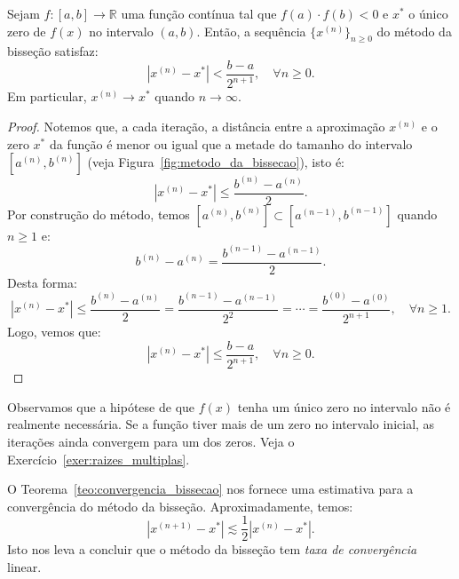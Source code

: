 \begin{ex}
\begin{teo}\label{teo:convergencia_bissecao} Sejam $f:[a, b]\to \mathbb{R}$ uma função contínua tal que $f(a)\cdot f(b) < 0$ e $x^*$ o único zero de $f(x)$ no intervalo $(a, b)$. Então, a sequência $\{x^{(n)}\}_{n \geq 0}$ do método da bisseção satisfaz:
  \begin{equation}
    |x^{(n)} - x^{*}| < \frac{b - a}{2^{n+1}},\quad\forall n\geq 0.
  \end{equation}
Em particular, $x^{(n)}\to x^*$ quando $n\to\infty$.
\end{teo}
\begin{proof}
 Notemos que, a cada iteração, a distância entre a aproximação $x^{(n)}$ e o zero $x^*$ da função é menor ou igual que a metade do tamanho do intervalo $[a^{(n)}, b^{(n)}]$ (veja Figura~\ref{fig:metodo_da_bissecao}), isto é:
\begin{equation}
  |x^{(n)}-x^*| \leq \frac{b^{(n)}-a^{(n)}}{2}.
\end{equation}
Por construção do método, temos $[a^{(n)}, b^{(n)}]\subset [a^{(n-1)}, b^{(n-1)}]$ quando $n \geq 1$ e:
\begin{equation}
  b^{(n)} - a^{(n)} = \frac{b^{(n-1)}-a^{(n-1)}}{2}.
\end{equation}
Desta forma:
\begin{equation}
  |x^{(n)}-x^*|  \leq \frac{b^{(n)}-a^{(n)}}{2} = \frac{b^{(n-1)}-a^{(n-1)}}{2^2} = \cdots = \frac{b^{(0)}-a^{(0)}}{2^{n+1}},\quad \forall n\geq 1.
\end{equation}
Logo, vemos que:
\begin{equation}
  |x^{(n)}-x^*|  \leq \frac{b-a}{2^{n+1}},\quad \forall n\geq 0.
\end{equation}
\end{proof}

Observamos que a hipótese de que $f(x)$ tenha um único zero no intervalo não é realmente necessária. Se a função tiver mais de um zero no intervalo inicial, as iterações ainda convergem para um dos zeros. Veja o Exercício~\ref{exer:raizes_multiplas}.

\begin{obs}
  O Teorema~\ref{teo:convergencia_bissecao} nos fornece uma estimativa para a convergência do método da bisseção. Aproximadamente, temos:
  \begin{equation}
    |x^{(n+1)} - x^*| \lesssim \frac{1}{2}|x^{(n)} - x^*|.
  \end{equation}
Isto nos leva a concluir que o método da bisseção tem \emph{taxa de convergência} linear.
\end{obs}


\end{ex}
